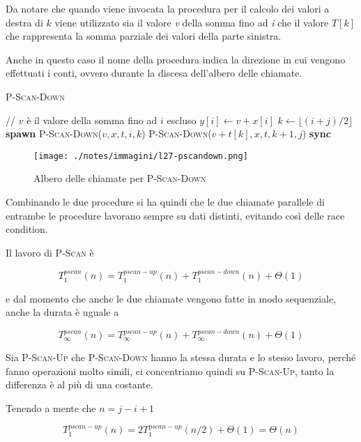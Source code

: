 Da notare che quando viene invocata la procedura per il calcolo dei valori a destra di $k$ viene utilizzato sia il valore \textit{v} della somma fino ad \textit{i} che il valore $T[k]$ che rappresenta la somma parziale dei valori della parte sinistra.

Anche in questo caso il nome della procedura indica la direzione in cui vengono effettuati i conti, ovvero durante la discesa dell'albero delle chiamate.

\begin{breakablealgorithm}
		\caption{\textsc{P-Scan-Down}}
		\begin{algorithmic}[1]
    \State // $ v $ è il valore della somma fino ad $ i $ escluso
        \State $y[i] \gets v+x[i]$
    \Else
        \State $ k \gets \lfloor(i+j)/2\rfloor$
        \State \textbf{spawn} \textsc{P-Scan-Down}($v,x,t,i,k$)
        \State \textsc{P-Scan-Down}($v+t[k],x,t,k+1,j$)
        \State \textbf{sync}
    \EndIf
\EndFunction
\end{algorithmic}
\end{breakablealgorithm}

\begin{figure}[htbp]
	\centering
	\texttt{[image: ./notes/immagini/l27-pscandown.png]}
	\caption{Albero delle chiamate per \textsc{P-Scan-Down}}
\end{figure}

Combinando le due procedure si ha quindi che le due chiamate parallele di entrambe le procedure lavorano sempre su dati distinti, evitando così delle race condition.

Il lavoro di \textsc{P-Scan} è

$$
T_{1}^{pscan}(n) = T_{1}^{pscan-up}(n) + T_{1}^{pscan-down}(n) + \Theta(1)
$$

e dal momento che anche le due chiamate vengono fatte in modo sequenziale, anche la durata è uguale a

$$
T_{\infty}^{pscan}(n) = T_{\infty}^{pscan-up}(n) + T_{\infty}^{pscan-down}(n) + \Theta(1)
$$

Sia \textsc{P-Scan-Up} che \textsc{P-Scan-Down} hanno la stessa durata e lo stesso lavoro, perché fanno operazioni molto simili, ci concentriamo quindi su \textsc{P-Scan-Up}, tanto la differenza è al più di una costante.

Tenendo a mente che $n = j - i +1 $

$$
T_{1}^{pscan-up}(n) = 2 T_{1}^{pscan-up}(n/2) + \Theta(1) = \Theta(n)
$$

